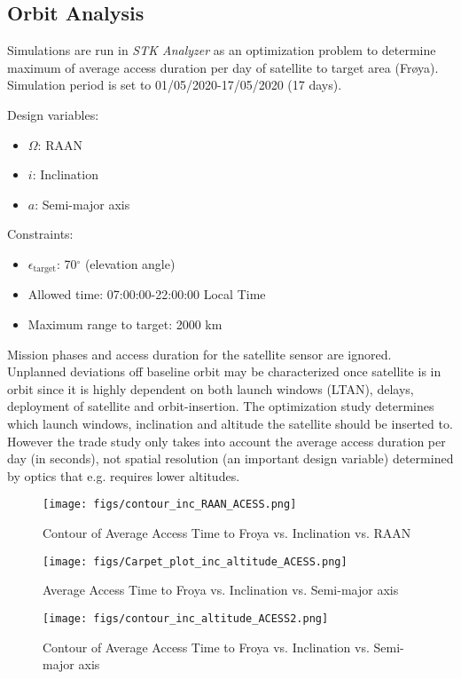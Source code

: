 \subsection{Orbit Analysis}
Simulations are run in \emph{STK Analyzer} as an optimization problem to determine maximum of average access duration per day of satellite to target area (Fr{\o}ya). Simulation period is set to 01/05/2020-17/05/2020 (17 days). 

\noindent Design variables:
\begin{itemize}
\item $\Omega$: RAAN
\item $i$: Inclination
\item $a$: Semi-major axis
\end{itemize}
\noindent Constraints:
\begin{itemize}
\item $\epsilon_{\text{target}}$: 70$^{\circ}$ (elevation angle)
\item Allowed time: 07:00:00-22:00:00 Local Time
\item Maximum range to target: 2000 km
\end{itemize}
Mission phases and access duration for the satellite sensor are ignored. Unplanned deviations off baseline orbit may be characterized once satellite is in orbit since it is highly dependent on both launch windows (LTAN), delays, deployment of satellite and orbit-insertion. The optimization study determines which launch windows, inclination and altitude the satellite should be inserted to. However the trade study only takes into account the average access duration per day (in seconds), not spatial resolution (an important design variable) determined by optics that e.g. requires lower altitudes. 
\begin{figure}[htbp]
  \centering
    \texttt{[image: figs/contour\_inc\_RAAN\_ACESS.png]}
    \caption{Contour of Average Access Time to Froya vs. Inclination vs. RAAN}
    \label{fig:acc_incl_RAAN}
\end{figure}
\begin{figure}[htbp]
  \centering
    \texttt{[image: figs/Carpet\_plot\_inc\_altitude\_ACESS.png]}
    \caption{Average Access Time to Froya vs. Inclination vs. Semi-major axis}
    \label{fig:acc_inc_altitude2}
\end{figure}
\begin{figure}[H]
  \centering
    \texttt{[image: figs/contour\_inc\_altitude\_ACESS2.png]}
    \caption{Contour of Average Access Time to Froya vs. Inclination vs. Semi-major axis}
    \label{fig:acc_incl_alt1}
\end{figure}
